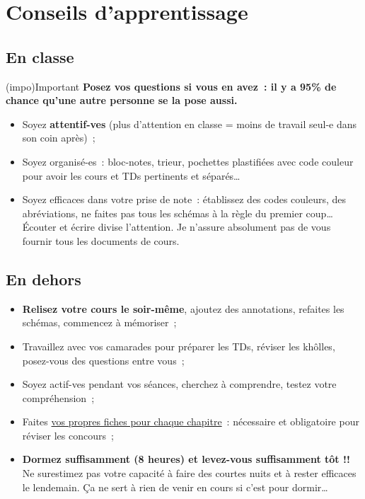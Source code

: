 \documentclass[a4paper, 10pt, garamond]{book}
\begin{document}
\section{Conseils d'apprentissage}
\subsection{En classe}

\begin{tcn}[cnt](impo){Important}
	\bfseries
	Posez vos questions si vous en avez~: il y a 95\% de chance qu'une autre
	personne se la pose aussi.
\end{tcn}
\begin{itemize}
	\item Soyez \textbf{attentif-ves} (plus d'attention en classe = moins de
	      travail seul-e dans son coin après)~;
	\item Soyez organisé-es~: bloc-notes, trieur, pochettes plastifiées avec
	      code couleur pour avoir les cours et TDs pertinents et séparés…
	\item Soyez efficaces dans votre prise de note~: établissez des codes
	      couleurs, des abréviations, ne faites pas tous les schémas à la règle du
	      premier coup… Écouter et écrire divise l'attention. Je n'assure
	      absolument pas de vous fournir tous les documents de cours.
\end{itemize}

\subsection{En dehors}
\begin{itemize}
	\item \textbf{Relisez votre cours le soir-même}, ajoutez des annotations,
	      refaites les schémas, commencez à mémoriser~;
	\item Travaillez avec vos camarades pour préparer les TDs, réviser les
	      khôlles, posez-vous des questions entre vous~;
	\item Soyez actif-ves pendant vos séances, cherchez à comprendre, testez
	      votre compréhension~;
	\item Faites \underline{vos propres fiches pour chaque chapitre}~:
	      nécessaire et obligatoire pour réviser les concours~;
	\item \textbf{Dormez suffisamment (8 heures) et levez-vous suffisamment tôt
		      !!} Ne surestimez pas votre capacité à faire des courtes nuits et à
	      rester efficaces le lendemain. Ça ne sert à rien de venir en cours si
	      c'est pour dormir…
\end{itemize}
\end{document}
